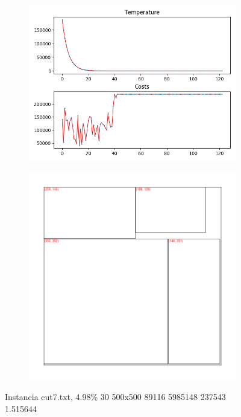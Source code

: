 \begin{figure}
\centering
\begin{subfigure}{.5\textwidth}
  \centering
  \includegraphics[width=1\linewidth]{results/cut7/3/plot}
  \label{fig:sub1}
\end{subfigure}%
\begin{subfigure}{.5\textwidth}
  \centering
  \includegraphics[width=1\linewidth]{results/cut7/3/cut}
  \label{fig:sub2}
\end{subfigure}
\caption{Instancia cut7.txt, 4.98\% 30 500x500 89116 5985148 237543 1.515644}
\label{fig:test}
\end{figure}


